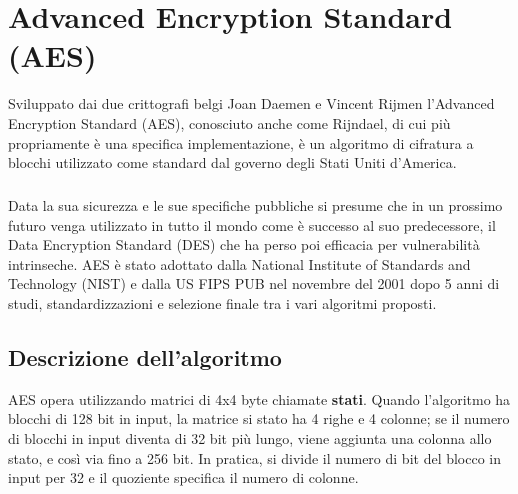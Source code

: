 \chapter{Advanced Encryption Standard (AES)}
Sviluppato dai due crittografi belgi Joan Daemen e Vincent Rijmen l'Advanced Encryption Standard (AES), conosciuto anche come Rijndael, di cui più propriamente è una specifica implementazione, è un algoritmo di cifratura a blocchi utilizzato come standard dal governo degli Stati Uniti d'America. 

\paragraph{}Data la sua sicurezza e le sue specifiche pubbliche si presume che in un prossimo futuro venga utilizzato in tutto il mondo come è successo al suo predecessore, il Data Encryption Standard (DES) che ha perso poi efficacia per vulnerabilità intrinseche. AES è stato adottato dalla National Institute of Standards and Technology (NIST) e dalla US FIPS PUB nel novembre del 2001 dopo 5 anni di studi, standardizzazioni e selezione finale tra i vari algoritmi proposti.

\section{Descrizione dell'algoritmo}
AES opera utilizzando matrici di 4x4 byte chiamate \textbf{stati}. Quando l'algoritmo ha blocchi di 128 bit in input, la matrice si stato ha 4 righe e 4 colonne; se il numero di blocchi in input diventa di 32 bit più lungo, viene aggiunta una colonna allo stato, e così via fino a 256 bit. In pratica, si divide il numero di bit del blocco in input per 32 e il quoziente specifica il numero di colonne.